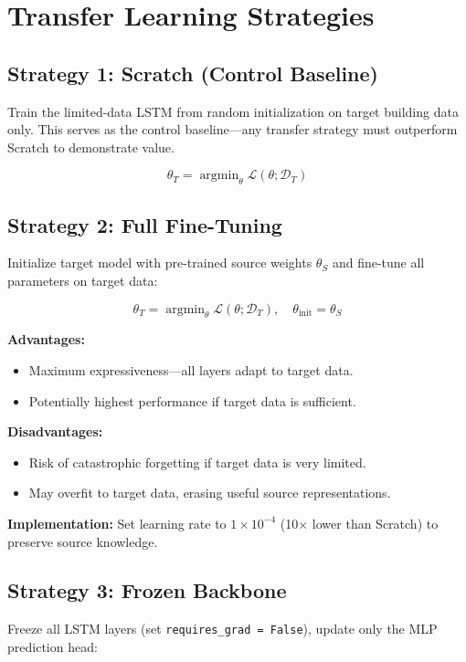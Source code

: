 \documentclass[12pt,a4paper]{report}
\newcommand{\argmin}{\operatorname{argmin}}
\begin{document}
\section{Transfer Learning Strategies}

\subsection{Strategy 1: Scratch (Control Baseline)}

Train the limited-data LSTM from random initialization on target building data only. This serves as the control baseline—any transfer strategy must outperform Scratch to demonstrate value.

\[
\theta_T = \argmin_{\theta} \mathcal{L}(\theta; \mathcal{D}_T)
\]

\subsection{Strategy 2: Full Fine-Tuning}

Initialize target model with pre-trained source weights \(\theta_S\) and fine-tune all parameters on target data:

\[
\theta_T = \argmin_{\theta} \mathcal{L}(\theta; \mathcal{D}_T), \quad \theta_{\text{init}} = \theta_S
\]

\textbf{Advantages:}
\begin{itemize}
    \item Maximum expressiveness—all layers adapt to target data.
    \item Potentially highest performance if target data is sufficient.
\end{itemize}

\textbf{Disadvantages:}
\begin{itemize}
    \item Risk of catastrophic forgetting if target data is very limited.
    \item May overfit to target data, erasing useful source representations.
\end{itemize}

\textbf{Implementation:} Set learning rate to \(1 \times 10^{-4}\) (10$\times$ lower than Scratch) to preserve source knowledge.

\subsection{Strategy 3: Frozen Backbone}

Freeze all LSTM layers (set \texttt{requires\_grad = False}), update only the MLP prediction head:
\end{document}
